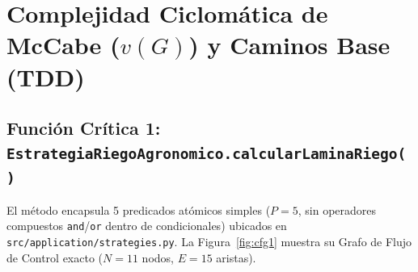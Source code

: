 \documentclass[11pt,letterpaper]{report}
\begin{document}
\section{Complejidad Ciclomática de McCabe (\texorpdfstring{$v(G)$}{v(G)}) y Caminos Base (TDD)}

\subsection{Función Crítica 1: \texttt{EstrategiaRiegoAgronomico.calcularLaminaRiego()}}
El método encapsula 5 predicados atómicos simples ($P = 5$, sin operadores compuestos \texttt{and}/\texttt{or} dentro de condicionales) ubicados en \texttt{src/application/strategies.py}. La Figura~\ref{fig:cfg1} muestra su Grafo de Flujo de Control exacto ($N = 11$ nodos, $E = 15$ aristas).
\end{document}
